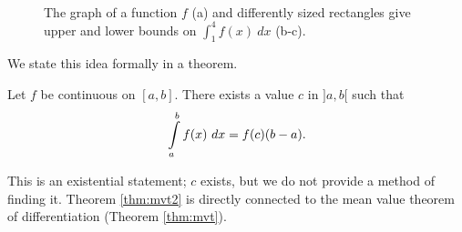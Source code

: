 \begin{figure}[h]
\centering
\qquad
{}\\
\qquad
{}
\caption{The graph of a function $f$ (a) and differently sized rectangles give upper and lower bounds on $\int_1^4 f(x)\ dx$ (b-c).}
\end{figure} 


We state this idea formally in a theorem.

\begin{theorem}\label{thm:mvt2}
Let $f$ be continuous on $[a,b]$. There exists a value $c$ in $]a,b[$ such that $$\displaystyle \int\limits_a^bf(x)\ dx = f(c)(b-a).$$
\end{theorem}

This is an existential statement; $c$ exists, but we do not provide a method of finding it. Theorem \ref{thm:mvt2} is directly connected to the mean value theorem of differentiation (Theorem \ref{thm:mvt}).

